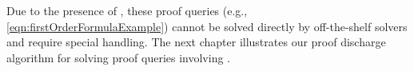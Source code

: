 Due to the presence of \recursiveRelations{}, these proof queries
(e.g., \cref{eqn:firstOrderFormulaExample}) cannot be solved directly by
off-the-shelf solvers and require special handling.
The next chapter illustrates our proof discharge algorithm for solving proof queries
involving \recursiveRelations{}.
